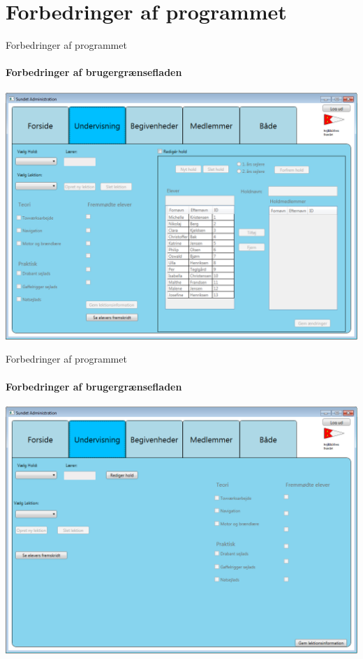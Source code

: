 \section{Forbedringer af programmet}
\begin{frame}{Forbedringer af programmet}
\framesubtitle{Forbedringer af brugergrænsefladen}
 \includegraphics[width=1\textwidth]{images/undervisning.png}
 \end{frame}
 \begin{frame}{Forbedringer af programmet}
 \framesubtitle{Forbedringer af brugergrænsefladen}
 \includegraphics[width=1\textwidth]{images/undervisningClean.png}
\end{frame}
